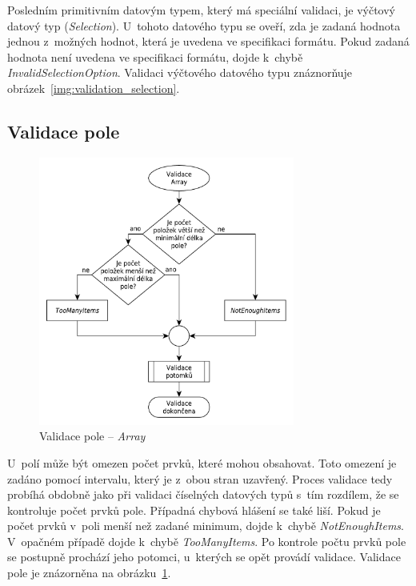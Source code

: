 \documentclass[FM,bw,DP]{tulthesis}
\begin{document}
Posledním primitivním datovým typem, který má speciální validaci, je výčtový datový typ (\textit{Selection}). U~tohoto datového typu se oveří, zda je zadaná hodnota jednou z~možných hodnot, která je uvedena ve specifikaci formátu. Pokud zadaná hodnota není uvedena ve specifikaci formátu, dojde k~chybě \textit{InvalidSelectionOption}. Validaci výčtového datového typu znáznorňuje obrázek~\ref{img:validation_selection}.

\clearpage
\subsection{Validace pole}

\begin{figure}[h]
	\centering
    \includegraphics[width=0.75\textwidth]{../img/validation_array.pdf}
    \caption{Validace pole -- \textit{Array}}
	\label{img:validation_array}
\end{figure}

U~polí může být omezen počet prvků, které mohou obsahovat. Toto omezení je zadáno pomocí intervalu, který je z~obou stran uzavřený. Proces validace tedy probíhá obdobně jako při validaci číselných datových typů s~tím rozdílem, že se kontroluje počet prvků pole. Případná chybová hlášení se také liší. Pokud je počet prvků v~poli menší než zadané minimum, dojde k~chybě \textit{NotEnoughItems}. V~opačném případě dojde k~chybě \textit{TooManyItems}. Po kontrole počtu prvků pole se postupně prochází jeho potomci, u~kterých se opět provádí validace. Validace pole je znázorněna na obrázku~\ref{img:validation_array}.
\end{document}
